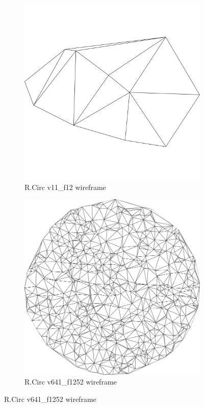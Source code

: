 \begin{figure}[ht]
\ffigbox
	{\begin{subfigure}[b]{0.48\linewidth}
		\includegraphics[width=1.0\linewidth,height=0.3\textheight,keepaspectratio]{data/synthetic_meshes/random_circle_tessellation_Dirac_delta_1_v11_f12_wireframe.png}
		\caption{R.Circ v11\_f12 wireframe}\label{fig:rcirc.a}
	\end{subfigure}
	\begin{subfigure}[b]{0.48\linewidth}
		\includegraphics[width=1.0\linewidth,height=0.3\textheight,keepaspectratio]{data/synthetic_meshes/random_circle_tessellation_Dirac_delta_10_v641_f1252_wireframe.png}
		\caption{R.Circ v641\_f1252 wireframe}\label{fig:rcirc.b}
	\end{subfigure}

}
\end{figure}
